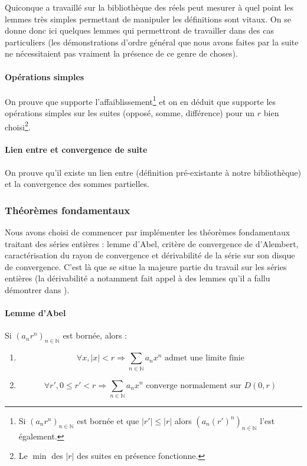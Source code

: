 Quiconque a travaillé sur la bibliothèque des réels peut mesurer à quel point les lemmes très simples permettant de manipuler les définitions sont vitaux. On se donne donc ici quelques lemmes qui permettront de travailler dans des cas particuliers (les démonstrations d'ordre général que nous avons faites par la suite ne nécessitaient pas vraiment la présence de ce genre de choses).

\paragraph{Opérations simples} On prouve que  supporte l'affaiblissement\footnote{Si $\left(a_n r^n\right)_{n\in \mathbb{N}}$ est bornée et que $|r'| \le |r|$ alors $\left(a_n (r')^n\right)_{n\in \mathbb{N}}$ l'est également.} et on en déduit que  supporte les opérations simples sur les suites (opposé, somme, différence) pour un $r$ bien choisi\footnote{Le $\min$ des $|r|$ des suites en présence fonctionne.}.

\paragraph{Lien entre  et convergence de suite} On prouve qu'il existe un lien entre  (définition pré-existante à notre bibliothèque) et la convergence des sommes partielles.

\subsubsection{Théorèmes fondamentaux}

Nous avons choisi de commencer par implémenter les théorèmes fondamentaux traitant des séries entières : lemme d'Abel, critère de convergence de d'Alembert, caractérisation du rayon de convergence et dérivabilité de la série sur son disque de convergence. C'est là que se situe la majeure partie du travail sur les séries entières (la dérivabilité a notamment fait appel à des lemmes qu'il a fallu démontrer dans ).

\paragraph{Lemme d'Abel} Si $\left(a_n r^n\right)_{n\in \mathbb{N}}$ est bornée, alors :
\begin{enumerate}
 \item $$\forall x, |x| < r \Rightarrow \sum_{n\in \mathbb{N}} a_n x^n \text{ admet une limite finie}$$
 \item $$\forall r', 0 \le r' < r \Rightarrow \sum_{n\in \mathbb{N}} a_n x^n \text{ converge normalement sur } D\left(0,r\right)$$
\end{enumerate}

